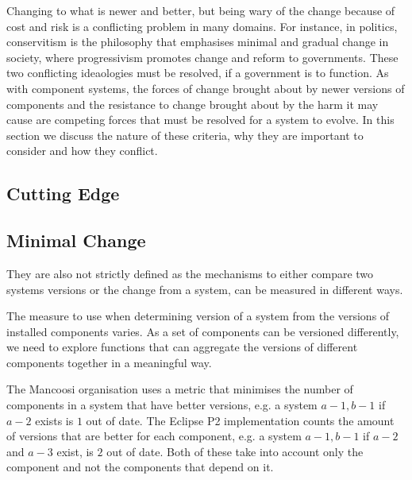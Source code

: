Changing to what is newer and better, but being wary of the change because of cost and risk is a conflicting problem in many domains.
For instance, in politics, conservitism is the philosophy that emphasises minimal and gradual change in society, %
where progressivism promotes change and reform to governments.
These two conflicting ideaologies must be resolved, if a government is to function. 
As with component systems, 
the forces of change brought about by newer versions of components and the resistance to change brought about by the harm it may cause
are competing forces that must be resolved for a system to evolve.
In this section we discuss the nature of these criteria, why they are important to consider and how they conflict.


\subsection{Cutting Edge}


\subsection{Minimal Change}
They are also not strictly defined as the mechanisms to either compare two systems versions or the change from a system,
can be measured in different ways.

The measure to use when determining version of a system from the versions of installed components varies.
As a set of components can be versioned differently, 
we need to explore functions that can aggregate the versions of different components together in a meaningful way.

The Mancoosi organisation uses a metric that minimises the number of components in a system that have better versions, 
e.g. a system $a-1,b-1$ if $a-2$ exists is $1$ out of date. 
The Eclipse P2 implementation counts the amount of versions that are better for each component,
e.g. a system $a-1,b-1$ if $a-2$ and $a-3$ exist, is $2$ out of date.
Both of these take into account only the component and not the components that depend on it.

